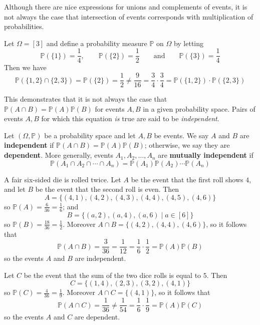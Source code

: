 Although there are nice expressions for unions and complements of events, it is not always the case that intersection of events corresponds with multiplication of probabilities.

\begin{example}
Let $\Omega = [3]$ and define a probability measure $\mathbb{P}$ on $\Omega$ by letting
\[ \mathbb{P}(\{1\}) = \frac{1}{4}, \qquad \mathbb{P}(\{2\}) = \frac{1}{2} \qquad \text{and} \qquad \mathbb{P}(\{3\}) = \frac{1}{4} \]
Then we have
\[ \mathbb{P}(\{1,2\} \cap \{2,3\}) = \mathbb{P}(\{2\}) = \frac{1}{2} \ne \frac{9}{16} = \frac{3}{4} \cdot \frac{3}{4} = \mathbb{P}(\{1,2\}) \cdot \mathbb{P}(\{2,3\}) \]
\end{example}

This demonstrates that it is not always the case that $\mathbb{P}(A \cap B) = \mathbb{P}(A) \mathbb{P}(B)$ for events $A,B$ in a given probability space. Pairs of events $A,B$ for which this equation \textit{is} true are said to be \textit{independent}.

\begin{definition}
\label{defIndependentEvents}
Let $(\Omega,\mathbb{P})$ be a probability space and let $A,B$ be events. We say $A$ and $B$ are \textbf{independent} if $\mathbb{P}(A \cap B) = \mathbb{P}(A)\mathbb{P}(B)$; otherwise, we say they are \textbf{dependent}. More generally, events $A_1,A_2,\dots,A_n$ are \textbf{mutually independent} if
\[ \mathbb{P}(A_1 \cap A_2 \cap \cdots \cap A_n) = \mathbb{P}(A_1)\mathbb{P}(A_2) \cdots \mathbb{P}(A_n) \]
\end{definition}

\begin{example}
A fair six-sided die is rolled twice. Let $A$ be the event that the first roll shows $4$, and let $B$ be the event that the second roll is even. Then
\[ A = \{ (4,1), (4,2), (4,3), (4,4), (4,5), (4,6) \} \]
so $\mathbb{P}(A) = \frac{6}{36} = \frac{1}{6}$; and
\[ B = \{ (a,2), (a,4), (a,6) \mid a \in [6] \} \]
so $\mathbb{P}(B) = \frac{18}{36} = \frac{1}{2}$. Moreover $A \cap B = \{ (4,2), (4,4), (4,6) \}$, so it follows that
\[ \mathbb{P}(A \cap B) = \frac{3}{36} = \frac{1}{12} = \frac{1}{6} \cdot \frac{1}{2} = \mathbb{P}(A)\mathbb{P}(B) \]
so the events $A$ and $B$ are independent.

Let $C$ be the event that the sum of the two dice rolls is equal to $5$. Then
\[ C = \{ (1,4), (2,3), (3,2), (4,1) \} \]
so $\mathbb{P}(C) = \frac{4}{36} = \frac{1}{9}$. Moreover $A \cap C = \{ (4, 1) \}$, so it follows that
\[ \mathbb{P}(A \cap C) = \frac{1}{36} \ne \frac{1}{54} = \frac{1}{6} \cdot \frac{1}{9} = \mathbb{P}(A)\mathbb{P}(C) \]
so the events $A$ and $C$ are dependent.
\end{example}

